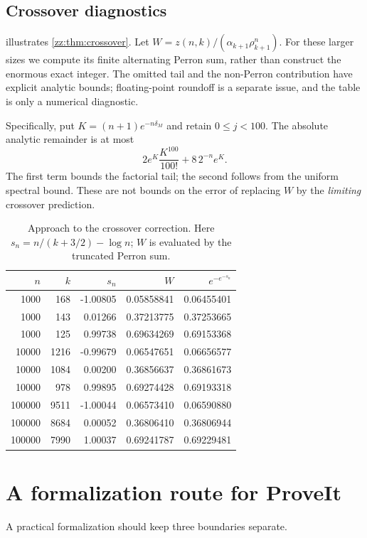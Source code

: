 \documentclass[11pt,a4paper]{article}
\theoremstyle{definition}
\begin{document}
\subsection{Crossover diagnostics}
 illustrates \cref{zz:thm:crossover}.  Let
$W=z(n,k)/(\alpha_{k+1}\rho_{k+1}^n)$.  For these larger sizes we compute its
finite alternating Perron sum, rather than construct the enormous exact
integer.  The omitted tail and the non-Perron contribution have explicit
analytic bounds; floating-point roundoff is a separate issue, and the table
is only a numerical diagnostic.

Specifically, put $K=(n+1)e^{-n\delta_M}$ and retain $0\le j<100$.
The absolute analytic remainder is at most
\[
 2e^K\frac{K^{100}}{100!}+8\,2^{-n}e^K.
\]
The first term bounds the factorial tail; the second follows from the uniform
spectral bound.  These are not bounds on the error of replacing $W$ by the
\emph{limiting} crossover prediction.
\begin{table}[ht]
\centering\small
\caption{Approach to the crossover correction.  Here $s_n=n/(k+3/2)-\log n$;
$W$ is evaluated by the truncated Perron sum.}
\begin{tabular}{rrrrr}
\toprule
$n$ & $k$ & $s_n$ & $W$ & $e^{-e^{-s_n}}$\\
\midrule
1000 & 168 & -1.00805 & 0.05858841 & 0.06455401 \\
1000 & 143 & 0.01266 & 0.37213775 & 0.37253665 \\
1000 & 125 & 0.99738 & 0.69634269 & 0.69153368 \\
10000 & 1216 & -0.99679 & 0.06547651 & 0.06656577 \\
10000 & 1084 & 0.00200 & 0.36856637 & 0.36861673 \\
10000 & 978 & 0.99895 & 0.69274428 & 0.69193318 \\
100000 & 9511 & -1.00044 & 0.06573410 & 0.06590880 \\
100000 & 8684 & 0.00052 & 0.36806410 & 0.36806944 \\
100000 & 7990 & 1.00037 & 0.69241787 & 0.69229481 \\
\bottomrule
\end{tabular}
\label{zz:tab:crossover}
\end{table}

\section{A formalization route for ProveIt}
\label{zz:sec:formalization}
A practical formalization should keep three boundaries separate.
\end{document}
